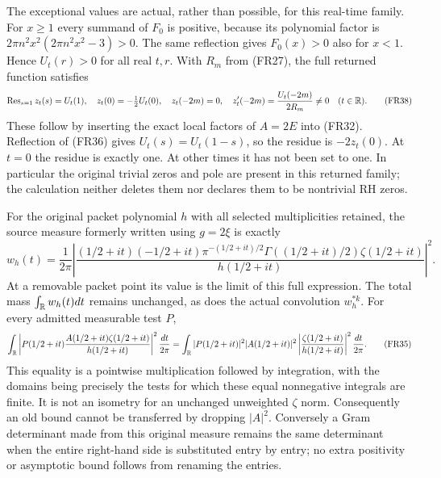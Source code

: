 \documentclass[11pt]{article}
\begin{document}
The exceptional values are actual, rather than possible, for this real-time family. For $x\geq1$ every summand of $F_0$ is positive, because its polynomial factor is $2\pi n^2x^2(2\pi n^2x^2-3)>0$. The same reflection gives $F_0(x)>0$ also for $x<1$. Hence $U_t(r)>0$ for all real $t,r$. With $R_m$ from (FR27), the full returned function satisfies
\begin{equation}
 \operatorname{Res}_{s=1}z_t(s)=U_t(1),\quad
 z_t(0)=-\tfrac12U_t(0),\quad
 z_t(-2m)=0,\quad z_t'(-2m)=\frac{U_t(-2m)}{2R_m}\ne0
 \quad(t\in\mathbb R).
 \tag{FR38}
\end{equation}
These follow by inserting the exact local factors of $A=2E$ into (FR32). Reflection of (FR36) gives $U_t(s)=U_t(1-s)$, so the residue is $-2z_t(0)$. At $t=0$ the residue is exactly one. At other times it has not been set to one. In particular the original trivial zeros and pole are present in this returned family; the calculation neither deletes them nor declares them to be nontrivial RH zeros.

For the original packet polynomial $h$ with all selected multiplicities retained, the source measure formerly written using $g=2\xi$ is exactly
\begin{equation}
 w_h(t)=\frac1{2\pi}\left|\frac{(1/2+it)(-1/2+it)
 \pi^{-(1/2+it)/2}\Gamma((1/2+it)/2)\zeta(1/2+it)}{h(1/2+it)}\right|^2.
 \tag{FR34}
\end{equation}
At a removable packet point its value is the limit of this full expression. The total mass $\int_\mathbb R w_h(t)dt$ remains unchanged, as does the actual convolution $w_h^{*k}$. For every admitted measurable test $P$,
\begin{equation}
 \int_\mathbb R\left|P(1/2+it)\frac{A(1/2+it)\zeta(1/2+it)}{h(1/2+it)}\right|^2\frac{dt}{2\pi}
 =\int_\mathbb R|P(1/2+it)|^2|A(1/2+it)|^2
 \left|\frac{\zeta(1/2+it)}{h(1/2+it)}\right|^2\frac{dt}{2\pi}.
 \tag{FR35}
\end{equation}
This equality is a pointwise multiplication followed by integration, with the domains being precisely the tests for which these equal nonnegative integrals are finite. It is not an isometry for an unchanged unweighted $\zeta$ norm. Consequently an old bound cannot be transferred by dropping $|A|^2$. Conversely a Gram determinant made from this original measure remains the same determinant when the entire right-hand side is substituted entry by entry; no extra positivity or asymptotic bound follows from renaming the entries.
\end{document}
